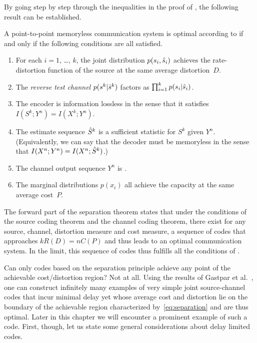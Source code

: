 By going step by step through the inequalities in the proof of
, the following result can be established. 

\begin{theorem}
  \label{thm:optimalityconditions}
  A point-to-point memoryless communication system is optimal according to
   if and only if the following conditions are all satisfied.
  \begin{enumerate}
    \item For each $i = 1$, \dots, $k$, the joint distribution $p(s_i,{\hat{s}}_i)$
      achieves the rate-distortion function of the source at the same average
      distortion~$D$.
    \item The \emph{reverse test channel} $p(s^k|{\hat{s}}^k)$ factors as
      $\prod_{i=1}^k p(s_i | {\hat{s}}_i)$. 
    \item The encoder is information lossless in the sense that it satisfies
      $I(S^k;Y^n) = I(X^k; Y^n)$. 
    \item The estimate sequence ${\hat{S}}^k$ is a sufficient statistic for $S^k$
      given $Y^n$. (Equivalently, we can say that the decoder must be memoryless
      in the sense that $I(X^n;Y^n) = I(X^n;{\hat{S}}^k)$.)
    \item The channel output sequence $Y^n$ is \iid.
    \item The marginal distributions $p(x_i)$ all achieve the capacity at the
      same average cost~$P$.
  \end{enumerate}
\end{theorem}

The forward part of the separation theorem states that under the
conditions of the source coding theorem and the channel coding theorem, there
exist for any source, channel, distortion measure and cost measure, a sequence
of codes that approaches $k R(D) = nC(P)$ and thus leads to an optimal
communication system. In the limit, this sequence of codes thus fulfills all the
conditions of .

Can only codes based on the separation principle achieve any point of the
achievable cost\slash distortion region? Not at all. Using the results of
Gastpar et al.~\cite{GastparRV2003}, one can construct infinitely many examples
of very simple joint source-channel codes that incur minimal delay yet whose
average cost and distortion lie on the boundary of the achievable region
characterized by~\eqref{eq:separation} and are thus optimal. Later
in this chapter we will encounter a prominent example of such a code. First,
though, let us state some general considerations about delay limited codes.


